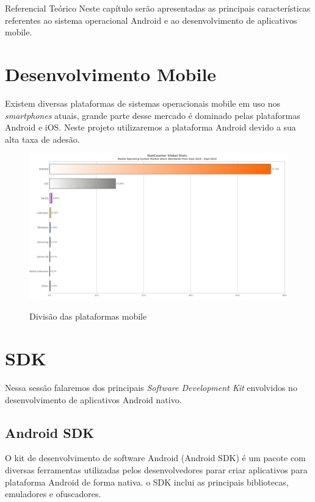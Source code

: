 \documentclass[
	12pt,				%
	openright,			%
	twoside,			%
	a4paper,			%
	english,			%
	french,				%
	spanish,			%
	brazil				%
	]{abntex2}
\begin{document}
\begin{chapter}{Referencial Teórico}
Neste capítulo serão apresentadas as principais características referentes ao sistema operacional Android e ao desenvolvimento de aplicativos mobile.

\section{Desenvolvimento Mobile}
Existem diversas plataformas de sistemas operacionais mobile em uso nos \textit{smartphones} atuais, grande parte desse mercado é dominado pelas plataformas Android e iOS. Neste projeto utilizaremos a plataforma Android devido a sua alta taxa de adesão.

\begin{figure}[h]
\centering
   \caption{Divisão das plataformas mobile}
   \includegraphics[scale=0.4]{media/grafico_plataformas.png}
     \label{fig:plataformas_mobile}
\end{figure}

\newpage
\section{SDK}
Nessa sessão falaremos dos principais \textit{Software Development Kit} envolvidos no desenvolvimento de aplicativos Android nativo.
\subsection{Android SDK}
O kit de desenvolvimento de software Android (Android SDK) é um pacote com diversas ferramentas utilizadas pelos desenvolvedores parar criar aplicativos para plataforma Android de forma nativa. o SDK inclui as principais bibliotecas, emuladores e ofuscadores.


\end{chapter}
\end{document}
